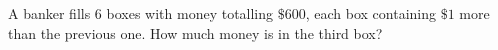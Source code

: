 A banker fills $6$ boxes with money totalling $\$600$, each box containing $\$1$ more than the previous one. How much money is in the third box?
